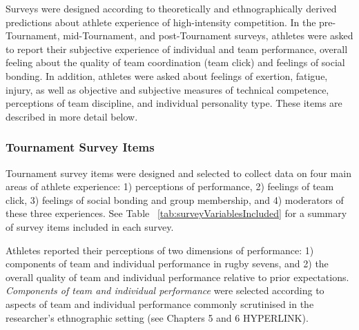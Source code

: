 Surveys were designed according to theoretically and ethnographically derived predictions about athlete experience of high-intensity competition.  In the pre-Tournament, mid-Tournament, and post-Tournament surveys, athletes were asked to report their subjective experience of individual and team performance, overall feeling about the quality of team coordination (team click) and feelings of social bonding.  In addition, athletes were asked about feelings of exertion, fatigue, injury, as well as objective and subjective measures of technical competence, perceptions of team discipline, and individual personality type. These items are described in more detail below.




\subsubsection{\label{survey:Tournament Survey Items}Tournament Survey Items}

Tournament survey items were designed and selected to collect data on four main areas of athlete experience: 1) perceptions of performance, 2) feelings of team click, 3) feelings of social bonding and group membership, and 4) moderators of these three experiences.  See Table ~\ref{tab:surveyVariablesIncluded} for a summary of survey items included in each survey.


Athletes reported their perceptions of two dimensions of performance: 1) components of team and individual performance in rugby sevens, and 2) the overall quality of team and individual performance relative to prior expectations.  \textit{Components of team and individual performance} were selected according to aspects of team and  individual performance commonly scrutinised in the researcher's ethnographic setting (see Chapters 5 and 6 HYPERLINK).

